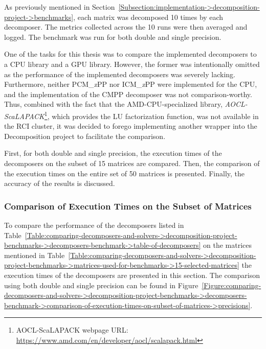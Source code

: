 As previously mentioned in Section~\ref{Subsection:implementation->decomposition-project->benchmarks}, each matrix was decomposed 10 times by each decomposer. The metrics collected across the 10 runs were then averaged and logged. The benchmark was run for both double and single precision.

One of the tasks for this thesis was to compare the implemented decomposers to a CPU library and a GPU library. However, the former was intentionally omitted as the performance of the implemented decomposers was severely lacking. Furthermore, neither PCM\_\textit{x}PP nor ICM\_\textit{x}PP were implemented for the CPU, and the implementation of the CMPP decomposer was not comparison-worthy. Thus, combined with the fact that the AMD-CPU-specialized library, \textit{AOCL-ScaLAPACK}\footnote{AOCL-ScaLAPACK webpage URL: \url{https://www.amd.com/en/developer/aocl/scalapack.html}}, which provides the LU factorization function, was not available in the RCI cluster, it was decided to forego implementing another wrapper into the Decomposition project to facilitate the comparison.

First, for both double and single precision, the execution times of the decomposers on the subset of 15 matrices are compared. Then, the comparison of the execution times on the entire set of 50 matrices is presented. Finally, the accuracy of the results is discussed.


\subsubsection{Comparison of Execution Times on the Subset of Matrices}\label{Subsection:comparing-decomposers-and-solvers->decomposition-project-benchmarks->decomposers-benchmark->comparison-of-execution-times-on-subset-of-matrices}
To compare the performance of the decomposers listed in Table~\ref{Table:comparing-decomposers-and-solvers->decomposition-project-benchmarks->decomposers-benchmark->table-of-decomposers} on the matrices mentioned in Table~\ref{Table:comparing-decomposers-and-solvers->decomposition-project-benchmarks->matrices-used-for-benchmarks->15-selected-matrices} the execution times of the decomposers are presented in this section. The comparison using both double and single precision can be found in Figure~\ref{Figure:comparing-decomposers-and-solvers->decomposition-project-benchmarks->decomposers-benchmark->comparison-of-execution-times-on-subset-of-matrices->precisions}.

